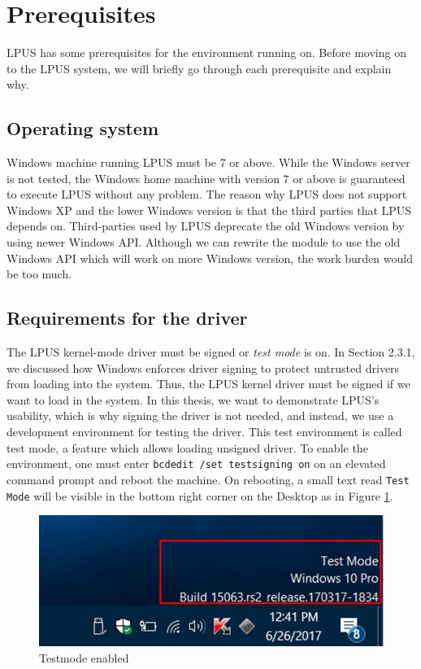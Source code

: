 \section[Prerequisites]{Prerequisites}

LPUS has some prerequisites for the environment running on. Before moving on to
the LPUS system, we will briefly go through each prerequisite and explain why.

\subsection[Operating system]{Operating system}

Windows machine running LPUS must be 7 or above. While the Windows server is
not tested, the Windows home machine with version 7 or above is guaranteed to
execute LPUS without any problem.  The reason why LPUS does not support Windows
XP and the lower Windows version is that the third parties that LPUS depends
on. Third-parties used by LPUS deprecate the old Windows version by using newer
Windows API. Although we can rewrite the module to use the old Windows API
which will work on more Windows version, the work burden would be too much.

\subsection[Requirements for the driver]{Requirements for the driver}

The LPUS kernel-mode driver must be signed or \textit{test mode} is on.  In
Section 2.3.1, we discussed how Windows enforces driver signing to protect
untrusted drivers from loading into the system. Thus, the LPUS kernel driver
must be signed if we want to load in the system. In this thesis, we want to
demonstrate LPUS's usability, which is why signing the driver is not needed,
and instead, we use a development environment for testing the driver. This test
environment is called test mode, a feature which allows loading unsigned
driver. To enable the environment, one must enter \texttt{bcdedit /set
testsigning on} on an elevated command prompt and reboot the machine. On
rebooting, a small text read \texttt{Test Mode} will be visible in the bottom
right corner on the Desktop as in Figure \ref{fig:testmode}.

\begin{figure}[h]
  \centering
  \caption{Testmode enabled}
  \label{fig:testmode}
  \includegraphics[scale=0.7]{images/testmode.png}
\end{figure}

